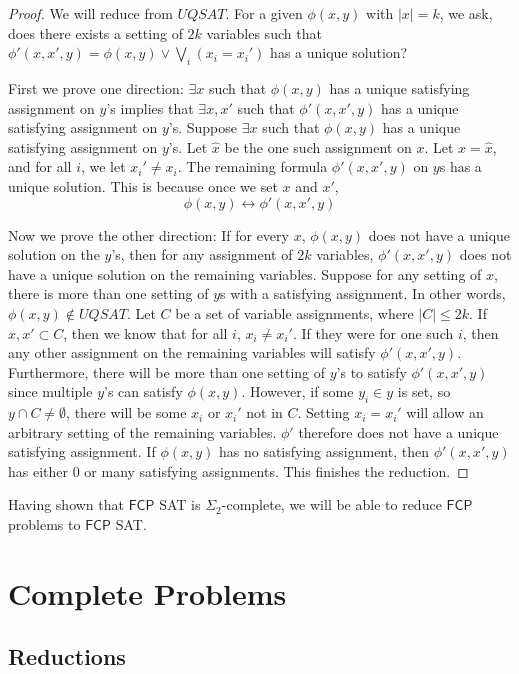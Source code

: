 \documentclass[runningheads,a4paper]{llncs}
\begin{document}
\begin{proof}
We will reduce from $UQSAT$. For a given $\phi(x, y)$ with $|x| = k$, we ask, does there exists a setting of $2k$ variables such that $\phi'(x, x', y) = \phi(x, y) \vee \bigvee_i (x_i = x_i')$ has a unique solution?

First we prove one direction: $\exists x$ such that $\phi(x,y)$ has a unique satisfying assignment on $y$'s implies that $\exists x, x'$ such that $\phi'(x,x',y)$ has a unique satisfying assignment on $y$'s.
Suppose $\exists x$ such that $\phi(x,y)$ has a unique satisfying assignment on $y$'s. Let $\hat{x}$ be the one such assignment on $x$. Let $x = \hat{x}$, and for all $i$, we let $x_i' \neq x_i$. The remaining formula $\phi'(x, x', y)$ on $y$s has a unique solution. This is because once we set $x$ and $x'$, 
\[ \phi(x, y) \leftrightarrow \phi'(x,x',y) \]

Now we prove the other direction: If for every $x$, $\phi(x,y)$ does not have a unique solution on the $y$'s, then for any assignment of $2k$ variables, $\phi'(x,x',y)$ does not have a unique solution on the remaining variables. 
Suppose for any setting of $x$, there is more than one setting of $y$s with a satisfying assignment. In other words, $\phi(x, y) \notin UQSAT$. Let $C$ be a set of variable assignments, where $|C| \leq 2k$. If $x, x' \subset C$, then we know that for all $i$, $x_i \neq x_i'$. If they were for one such $i$, then any other assignment on the remaining variables will satisfy $\phi'(x,x',y)$. Furthermore, there will be more than one setting of $y$'s to satisfy $\phi'(x,x',y)$ since multiple $y$'s can satisfy $\phi(x,y)$. However, if some $y_i \in y$ is set, so $y \cap C \neq \emptyset$, there will be some $x_i$ or $x_i'$ not in $C$. Setting $x_i = x_i'$ will allow an arbitrary setting of the remaining variables. $\phi'$ therefore does not have a unique satisfying assignment. If $\phi(x,y)$ has no satisfying assignment, then $\phi'(x,x',y)$ has either 0 or many satisfying assignments. This finishes the reduction.
\end{proof}

Having shown that $\mathsf{FCP}$ SAT is $\Sigma_2$-complete, we will be able to reduce $\mathsf{FCP}$ problems to $\mathsf{FCP}$ SAT.

\section{Complete Problems}
\label{sec:The Problems}

\subsection{Reductions}
\end{document}
